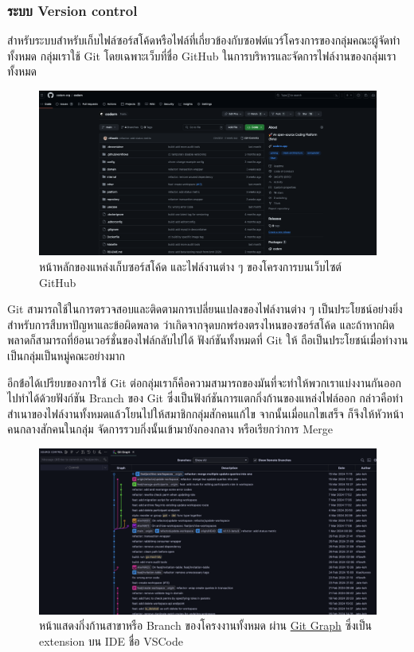 \documentclass[12pt,one side,openright,a4paper]{cpe-thesis-th}
\newcommand{\thaijustify}[1]{%
  \par\hspace{30pt}\justifying
  #1
}
\begin{document}
        \subsubsection{ระบบ Version control}
            \thaijustify{
                สำหรับระบบสำหรับเก็บไฟล์ซอร์สโค้ดหรือไฟล์ที่เกี่ยวข้องกับซอฟต์แวร์โครงการของกลุ่มคณะผู้จัดทำทั้งหมด กลุ่มเราใช้ Git โดยเฉพาะเว็บที่ชื่อ GitHub ในการบริหารและจัดการไฟล์งานของกลุ่มเราทั้งหมด
            }
            \begin{figure}[H]
                \centering
                \includegraphics[width=12cm]{figure/results/gh-repo.png}
                \caption[หน้าหลักของแหล่งเก็บไฟล์งานของโครงงานบน GitHub]{หน้าหลักของแหล่งเก็บซอร์สโค้ด และไฟล์งานต่าง ๆ ของโครงการบนเว็บไซต์ GitHub}
                \label{fig:res-gh-repo}
            \end{figure}
            \thaijustify{
                Git สามารถใช้ในการตรวจสอบและติดตามการเปลี่ยนแปลงของไฟล์งานต่าง ๆ เป็นประโยชน์อย่างยิ่งสำหรับการสืบหาปัญหาและข้อผิดพลาด ว่าเกิดจากจุดบกพร่องตรงไหนของซอร์สโค้ด และถ้าหากผิดพลาดก็สามารถที่ย้อนเวอร์ชั่นของไฟล์กลับไปได้ ฟังก์ชันทั้งหมดที่ Git ให้ ถือเป็นประโยชน์เมื่อทำงานเป็นกลุ่มเป็นหมู่คณะอย่างมาก
            }
            \thaijustify{
                อีกข้่อได้เปรียบของการใช้ Git ต่อกลุ่มเราก็คือความสามารถของมันที่จะทำให้พวกเราแบ่งงานกันออกไปทำได้ด้วยฟังก์ชัน Branch ของ Git ซึ่งเป็นฟังก์ชันการแตกกิ่งก้านของแหล่งไฟล์ออก กล่าวคือทำสำเนาของไฟล์งานทั้งหมดแล้วโยนไปให้สมาชิกกลุ่มสักคนแก้ไข จากนั้นเมื่อแกไขเสร็จ ก็จึงให้หัวหน้าคนกลางสักคนในกลุ่ม จัดการรวบกิ่งนั้นเข้ามายังกองกลาง หรือเรียกว่าการ Merge
            }
            \begin{figure}[H]
                \centering
                \includegraphics[width=12cm]{figure/results/gh-graph.png}
                \caption[หน้าแสดงกิ่งก้านสาขาหรือ Branch ของโครงงาน ผ่าน Git บน IDE]{หน้าแสดงกิ่งก้านสาขาหรือ Branch ของโครงงานทั้งหมด ผ่าน \href{https://marketplace.visualstudio.com/items?itemName=mhutchie.git-graph}{Git Graph} ซึ่งเป็น extension บน IDE ชื่อ VSCode}
                \label{fig:res-gh-graph}
            \end{figure}
\end{document}
